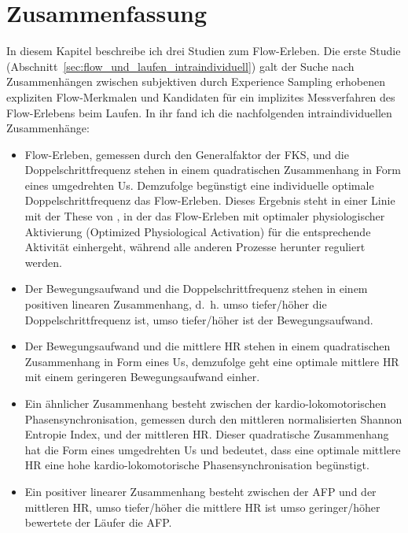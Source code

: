 

\section{Zusammenfassung} \label{sec:zusammenfassung_5}

In diesem Kapitel beschreibe ich drei Studien zum Flow-Erleben. Die erste Studie (Abschnitt~\ref{sec:flow_und_laufen_intraindividuell}) galt der Suche nach Zusammenhängen zwischen subjektiven durch Experience Sampling erhobenen expliziten Flow-Merkmalen und Kandidaten für ein implizites Messverfahren des Flow-Erlebens beim Laufen. In ihr fand ich die nachfolgenden intraindividuellen Zusammenhänge: 
\begin{itemize}
	\item Flow-Erleben, gemessen durch den Generalfaktor der \ac{FKS}, und die Doppelschrittfrequenz stehen in einem quadratischen Zusammenhang in Form eines umgedrehten Us. Demzufolge begünstigt eine individuelle optimale Doppelschrittfrequenz das Flow-Erleben. Dieses Ergebnis steht in einer Linie mit der These von \citet[][S.~148]{Peifer2012}, in der das Flow-Erleben mit optimaler physiologischer Aktivierung (Optimized Physiological Activation) für die entsprechende Aktivität einhergeht, während alle anderen Prozesse herunter reguliert werden.
	
	\item Der Bewegungsaufwand und die Doppelschrittfrequenz stehen in einem positiven linearen Zusammenhang, d.~h. umso tiefer/höher die Doppelschrittfrequenz ist, umso tiefer/höher ist der Bewegungsaufwand.
	
	\item Der Bewegungsaufwand und die mittlere \ac{HR} stehen in einem quadratischen Zusammenhang in Form eines Us, demzufolge geht eine optimale mittlere \ac{HR} mit einem geringeren Bewegungsaufwand einher.
	
	\item Ein ähnlicher Zusammenhang besteht zwischen der kardio-lokomotorischen Phasensynchronisation, gemessen durch den mittleren normalisierten Shannon Entropie Index, und der mittleren \ac{HR}. Dieser quadratische Zusammenhang hat die Form eines umgedrehten Us und bedeutet, dass eine optimale mittlere \ac{HR} eine hohe kardio-lokomotorische Phasensynchronisation begünstigt. 
	
	\item Ein positiver linearer Zusammenhang besteht zwischen der \ac{AFP} und der mittleren \ac{HR}, umso tiefer/höher die mittlere \ac{HR} ist umso geringer/höher bewertete der Läufer die \ac{AFP}. 
\end{itemize}

